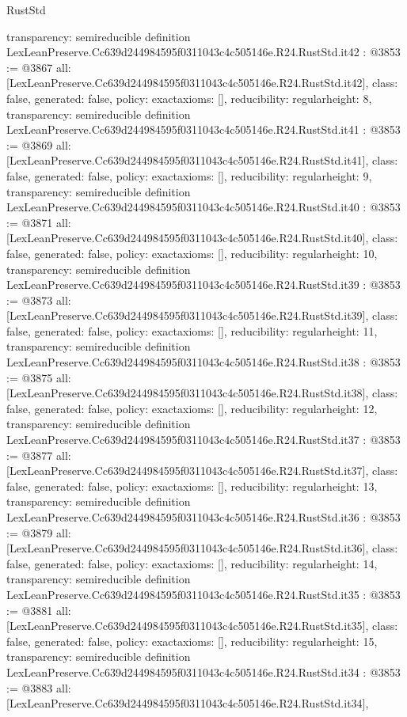 \begin{lexlean}{RustStd}
\begin{coremodule}
{  transparency: semireducible
}
definition LexLeanPreserve.Cc639d244984595f0311043c4c505146e.R24.RustStd.it42 : @3853 := @3867 {
  all: [LexLeanPreserve.Cc639d244984595f0311043c4c505146e.R24.RustStd.it42],
  class: false,
  generated: false,
  policy: exact{axioms: []},
  reducibility: regular{height: 8},
  transparency: semireducible
}
definition LexLeanPreserve.Cc639d244984595f0311043c4c505146e.R24.RustStd.it41 : @3853 := @3869 {
  all: [LexLeanPreserve.Cc639d244984595f0311043c4c505146e.R24.RustStd.it41],
  class: false,
  generated: false,
  policy: exact{axioms: []},
  reducibility: regular{height: 9},
  transparency: semireducible
}
definition LexLeanPreserve.Cc639d244984595f0311043c4c505146e.R24.RustStd.it40 : @3853 := @3871 {
  all: [LexLeanPreserve.Cc639d244984595f0311043c4c505146e.R24.RustStd.it40],
  class: false,
  generated: false,
  policy: exact{axioms: []},
  reducibility: regular{height: 10},
  transparency: semireducible
}
definition LexLeanPreserve.Cc639d244984595f0311043c4c505146e.R24.RustStd.it39 : @3853 := @3873 {
  all: [LexLeanPreserve.Cc639d244984595f0311043c4c505146e.R24.RustStd.it39],
  class: false,
  generated: false,
  policy: exact{axioms: []},
  reducibility: regular{height: 11},
  transparency: semireducible
}
definition LexLeanPreserve.Cc639d244984595f0311043c4c505146e.R24.RustStd.it38 : @3853 := @3875 {
  all: [LexLeanPreserve.Cc639d244984595f0311043c4c505146e.R24.RustStd.it38],
  class: false,
  generated: false,
  policy: exact{axioms: []},
  reducibility: regular{height: 12},
  transparency: semireducible
}
definition LexLeanPreserve.Cc639d244984595f0311043c4c505146e.R24.RustStd.it37 : @3853 := @3877 {
  all: [LexLeanPreserve.Cc639d244984595f0311043c4c505146e.R24.RustStd.it37],
  class: false,
  generated: false,
  policy: exact{axioms: []},
  reducibility: regular{height: 13},
  transparency: semireducible
}
definition LexLeanPreserve.Cc639d244984595f0311043c4c505146e.R24.RustStd.it36 : @3853 := @3879 {
  all: [LexLeanPreserve.Cc639d244984595f0311043c4c505146e.R24.RustStd.it36],
  class: false,
  generated: false,
  policy: exact{axioms: []},
  reducibility: regular{height: 14},
  transparency: semireducible
}
definition LexLeanPreserve.Cc639d244984595f0311043c4c505146e.R24.RustStd.it35 : @3853 := @3881 {
  all: [LexLeanPreserve.Cc639d244984595f0311043c4c505146e.R24.RustStd.it35],
  class: false,
  generated: false,
  policy: exact{axioms: []},
  reducibility: regular{height: 15},
  transparency: semireducible
}
definition LexLeanPreserve.Cc639d244984595f0311043c4c505146e.R24.RustStd.it34 : @3853 := @3883 {
  all: [LexLeanPreserve.Cc639d244984595f0311043c4c505146e.R24.RustStd.it34],
}
\end{coremodule}
\end{lexlean}
